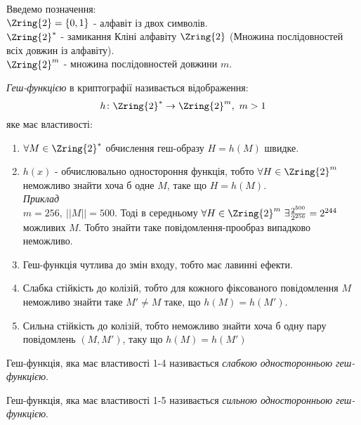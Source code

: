 Введемо позначення:\\
\( \Zring{2} = \{0, 1\} \) - алфавіт із двох символів.\\
\( \Zring{2}^{*} \) - замикання Кліні алфавіту \( \Zring{2} \) (Множина послідовностей всіх довжин із алфавіту). \\
\( \Zring{2}^{m} \) - множина послідовностей довжини \( m \).

\begin{mydef}
\textit{Геш-функцією} в криптографії називається відображення:\\
\[ h \colon \Zring{2}^{*} \rightarrow \Zring{2}^{m},\ m>1\]
яке має властивості:
\begin{enumerate}
\item \( \forall M \in \Zring{2}^{*} \) обчислення геш-образу \( H = h(M) \) швидке.
\item \( h(x) \) - обчислювально одностороння функція, тобто \( \forall H \in \Zring{2}^{m} \) неможливо знайти хоча б одне \( M \), таке що \( H = h(M) \).\\
\textit{Приклад}\\
\( m=256,\ ||M||=500 \). Тоді в середньому \( \forall H \in \Zring{2}^{m}\ \exists \frac{2^{500}}{2^{256}} = 2^{244} \) можливих \( M \). Тобто знайти таке повідомлення-прообраз випадково неможливо.
\item Геш-функція чутлива до змін входу, тобто має лавинні ефекти.
\item Слабка стійкість до колізій, тобто для кожного фіксованого повідомлення \( M \) неможливо знайти таке \( M' \neq M \) таке, що \( h(M) = h(M') \).
\item Сильна стійкість до колізій, тобто неможливо знайти хоча б одну пару повідомлень \( (M, M') \), таку що \( h(M) = h(M') \)
\end{enumerate}
\end{mydef}

\begin{mydef}
Геш-функція, яка має властивості 1-4 називається \textit{слабкою односторонньою геш-функцією}.
\end{mydef}

\begin{mydef}
Геш-функція, яка має властивості 1-5 називається \textit{сильною односторонньою геш-функцією}.
\end{mydef}

